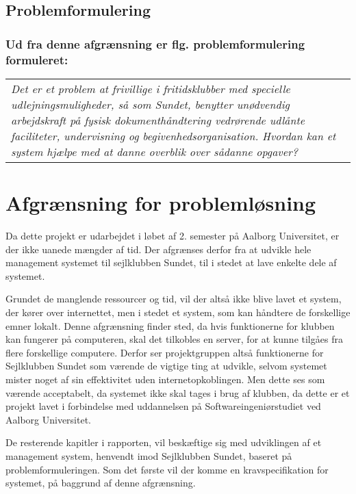 \subsection*{Problemformulering}
\subsubsection*{Ud fra denne afgrænsning er flg. problemformulering formuleret:}

\begin{center}
  \begin{tabular}{|p{14cm}|}
    \textit{Det er et problem at frivillige i fritidsklubber med specielle udlejningsmuligheder, så som Sundet, benytter unødvendig arbejdskraft på fysisk dokumenthåndtering vedrørende udlånte faciliteter, undervisning og begivenhedsorganisation. 
    Hvordan kan et system hjælpe med at danne overblik over sådanne opgaver?}
  \end{tabular}
\end{center}


\section{Afgrænsning for problemløsning}

Da dette projekt er udarbejdet i løbet af 2. semester på Aalborg Universitet, er der ikke uanede mængder af tid. 
Der afgrænses derfor fra at udvikle hele management systemet til sejlklubben Sundet, til i stedet at lave enkelte dele af systemet.

Grundet de manglende ressourcer og tid, vil der altså ikke blive lavet et system, der kører over internettet, men i stedet et system, som kan håndtere de forskellige emner lokalt. 
Denne afgrænsning finder sted, da hvis funktionerne for klubben kan fungerer på computeren, skal det tilkobles en server, for at kunne tilgåes fra flere forskellige computere. 
Derfor ser projektgruppen altså funktionerne for Sejlklubben Sundet som værende de vigtige ting at udvikle, selvom systemet mister noget af sin effektivitet uden internetopkoblingen.
Men dette ses som værende acceptabelt, da systemet ikke skal tages i brug af klubben, da dette er et projekt lavet i forbindelse med uddannelsen på Softwareingeniørstudiet ved Aalborg Universitet.

De resterende kapitler i rapporten, vil beskæftige sig med udviklingen af et management system, henvendt imod Sejlklubben Sundet, baseret på problemformuleringen. 
Som det første vil der komme en kravspecifikation for systemet, på baggrund af denne afgrænsning.
